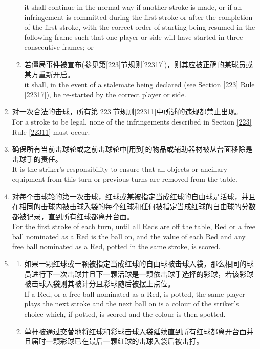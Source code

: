 \begin{enumerate}[label=(\alph*)]
\begin{enumerate}[label=(\roman*)]
        it shall continue in the normal way if another stroke is made, or if an infringement is committed during the first stroke or after the completion of the first stroke, with the correct order of starting being resumed in the following frame such that one player or side will have started in three consecutive frames; or
        \item \label{2233diii}若僵局事件被宣布(参见第\ref{223}节规则\ref{22317})，则其应被正确的某球员或某方重新开启。\\
        it shall, in the event of a stalemate being declared (see Section \ref{223} Rule \ref{22317}), be re-started by the correct player or side.
    \end{enumerate}
    \item 对一次合法的击球，所有第\ref{223}节规则\ref{22311}中所述的违规都禁止出现。\\
    For a stroke to be legal, none of the infringements described in Section \ref{223} Rule \ref{22311} must occur.
    \item 确保所有当前击球轮或之前击球轮中[用到]的物品或辅助器材被从台面移除是击球手的责任。\\
    It is the striker's responsibility to ensure that all objects or ancillary equipment from this turn or previous turns are removed from the table.
    \item 对每个击球轮的第一次击球，红球或某被指定当成红球的自由球是活球，并且在相同的击球内被击球入袋的每个红球和任何被指定当成红球的自由球的分数都被记录，直到所有红球都离开台面。\\
    For the first stroke of each turn, until all Reds are off the table, Red or a free ball nominated as a Red is the ball on, and the value of each Red and any free ball nominated as a Red, potted in the same stroke, is scored.
    \item \label{2233h}
    \begin{enumerate}[label=(\roman*)]
        \item 如果一颗红球或一颗被指定当成红球的自由球被击球入袋，那么相同的球员进行下一次击球并且下一颗活球是一颗依击球手选择的彩球，若该彩球被击球入袋则其被计分且彩球随后被摆上点位。\\
        If a Red, or a free ball nominated as a Red, is potted, the same player plays the next stroke and the next ball on is a colour of the striker's choice which, if potted, is scored and the colour is then spotted.
        \item 单杆被通过交替地将红球和彩球击球入袋延续直到所有红球都离开台面并且届时一颗彩球已在最后一颗红球的击球入袋后被击打。\\

\end{enumerate}
\end{enumerate}
